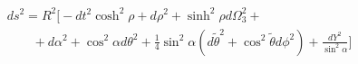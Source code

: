 \begin{equation}
\begin{array}{l}
ds^2 = R^2 \Big[ 
-dt^2 \cosh^2 \rho +  d \rho^2 + \sinh^2 \rho d \Omega_3^2 +  \\
\qquad
+ d \alpha^2 + \cos^2 \alpha d \theta^2 + 
\frac{1}{4} \sin^2 \alpha ( d \tilde{\theta}^2 + 
    \cos^2 \tilde{\theta} d \phi^2 ) +
\displaystyle{\frac{dY^2}{\sin^2 \alpha}}  \Big]
\end{array}
\end{equation}

